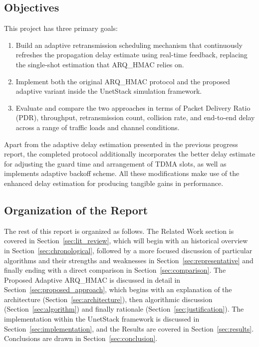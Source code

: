 \documentclass{article}
\begin{document}
\subsection{Objectives}
This project has three primary goals:
\begin{enumerate}
    \item Build an adaptive retransmission scheduling mechanism that continuously refreshes the propagation delay estimate using real-time feedback, replacing the single-shot estimation that ARQ\_HMAC relies on.
    \item Implement both the original ARQ\_HMAC protocol and the proposed adaptive variant inside the UnetStack simulation framework.
    \item Evaluate and compare the two approaches in terms of Packet Delivery Ratio (PDR), throughput, retransmission count, collision rate, and end-to-end delay across a range of traffic loads and channel conditions.
\end{enumerate}
Apart from the adaptive delay estimation presented in the previous progress report, the completed protocol additionally incorporates the better delay estimate for adjusting the guard time and arrangement of TDMA slots, as well as implements adaptive backoff scheme. All these modifications make use of the enhanced delay estimation for producing tangible gains in performance.

\subsection{Organization of the Report}
The rest of this report is organized as follows. The Related Work section is covered in Section~\ref{sec:lit_review}, which will begin with an historical overview in Section~\ref{sec:chronological}, followed by a more focused discussion of particular algorithms and their strengths and weaknesses in Section~\ref{sec:representative} and finally ending with a direct comparison in Section~\ref{sec:comparison}. The Proposed Adaptive ARQ\_HMAC is discussed in detail in Section~\ref{sec:proposed_approach}, which begins with an explanation of the architecture (Section~\ref{sec:architecture}), then algorithmic discussion (Section~\ref{sec:algorithm}) and finally rationale (Section~\ref{sec:justification}). The implementation within the UnetStack framework is discussed in Section~\ref{sec:implementation}, and the Results are covered in Section~\ref{sec:results}. Conclusions are drawn in Section~\ref{sec:conclusion}.

\end{document}
